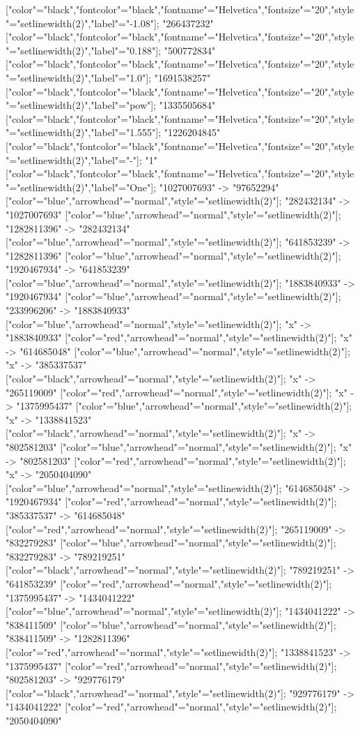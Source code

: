 ["color"="black","fontcolor"="black","fontname"="Helvetica","fontsize"="20","style"="setlinewidth(2)","label"="-1.08"]; "266437232" ["color"="black","fontcolor"="black","fontname"="Helvetica","fontsize"="20","style"="setlinewidth(2)","label"="0.188"]; "500772834" ["color"="black","fontcolor"="black","fontname"="Helvetica","fontsize"="20","style"="setlinewidth(2)","label"="1.0"]; "1691538257" ["color"="black","fontcolor"="black","fontname"="Helvetica","fontsize"="20","style"="setlinewidth(2)","label"="pow"]; "1335505684" ["color"="black","fontcolor"="black","fontname"="Helvetica","fontsize"="20","style"="setlinewidth(2)","label"="1.555"]; "1226204845" ["color"="black","fontcolor"="black","fontname"="Helvetica","fontsize"="20","style"="setlinewidth(2)","label"="-"]; "1" ["color"="black","fontcolor"="black","fontname"="Helvetica","fontsize"="20","style"="setlinewidth(2)","label"="One"]; "1027007693" -> "97652294" ["color"="blue","arrowhead"="normal","style"="setlinewidth(2)"]; "282432134" -> "1027007693" ["color"="blue","arrowhead"="normal","style"="setlinewidth(2)"]; "1282811396" -> "282432134" ["color"="blue","arrowhead"="normal","style"="setlinewidth(2)"]; "641853239" -> "1282811396" ["color"="blue","arrowhead"="normal","style"="setlinewidth(2)"]; "1920467934" -> "641853239" ["color"="blue","arrowhead"="normal","style"="setlinewidth(2)"]; "1883840933" -> "1920467934" ["color"="blue","arrowhead"="normal","style"="setlinewidth(2)"]; "233996206" -> "1883840933" ["color"="blue","arrowhead"="normal","style"="setlinewidth(2)"]; "x" -> "1883840933" ["color"="red","arrowhead"="normal","style"="setlinewidth(2)"]; "x" -> "614685048" ["color"="blue","arrowhead"="normal","style"="setlinewidth(2)"]; "x" -> "385337537" ["color"="black","arrowhead"="normal","style"="setlinewidth(2)"]; "x" -> "265119009" ["color"="red","arrowhead"="normal","style"="setlinewidth(2)"]; "x" -> "1375995437" ["color"="blue","arrowhead"="normal","style"="setlinewidth(2)"]; "x" -> "1338841523" ["color"="black","arrowhead"="normal","style"="setlinewidth(2)"]; "x" -> "802581203" ["color"="blue","arrowhead"="normal","style"="setlinewidth(2)"]; "x" -> "802581203" ["color"="red","arrowhead"="normal","style"="setlinewidth(2)"]; "x" -> "2050404090" ["color"="blue","arrowhead"="normal","style"="setlinewidth(2)"]; "614685048" -> "1920467934" ["color"="red","arrowhead"="normal","style"="setlinewidth(2)"]; "385337537" -> "614685048" ["color"="red","arrowhead"="normal","style"="setlinewidth(2)"]; "265119009" -> "832279283" ["color"="blue","arrowhead"="normal","style"="setlinewidth(2)"]; "832279283" -> "789219251" ["color"="black","arrowhead"="normal","style"="setlinewidth(2)"]; "789219251" -> "641853239" ["color"="red","arrowhead"="normal","style"="setlinewidth(2)"]; "1375995437" -> "1434041222" ["color"="blue","arrowhead"="normal","style"="setlinewidth(2)"]; "1434041222" -> "838411509" ["color"="blue","arrowhead"="normal","style"="setlinewidth(2)"]; "838411509" -> "1282811396" ["color"="red","arrowhead"="normal","style"="setlinewidth(2)"]; "1338841523" -> "1375995437" ["color"="red","arrowhead"="normal","style"="setlinewidth(2)"]; "802581203" -> "929776179" ["color"="black","arrowhead"="normal","style"="setlinewidth(2)"]; "929776179" -> "1434041222" ["color"="red","arrowhead"="normal","style"="setlinewidth(2)"]; "2050404090" 